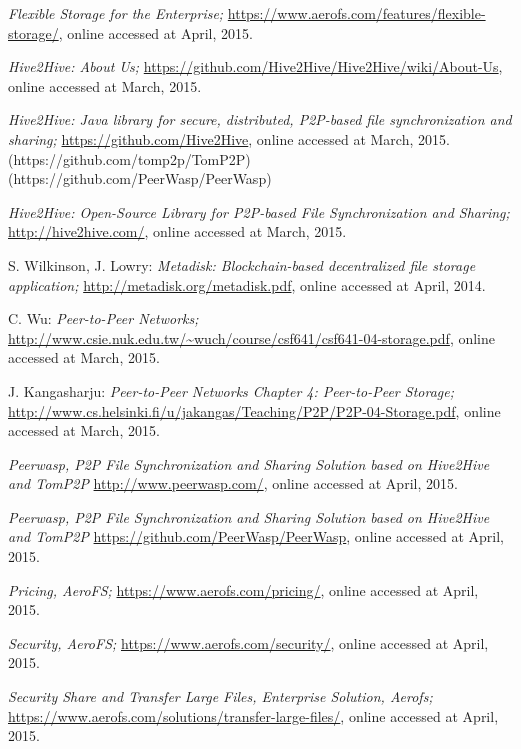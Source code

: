 \begin{thebibliography}{99}
		\emph{Flexible Storage for the Enterprise;}
		\url{https://www.aerofs.com/features/flexible-storage/},
		online accessed at April, 2015.

		\emph{Hive2Hive: About Us;}
		\url{https://github.com/Hive2Hive/Hive2Hive/wiki/About-Us},
		online accessed at March, 2015.

		\emph{Hive2Hive: Java library for secure, distributed, P2P-based file synchronization and sharing;}
		\url{https://github.com/Hive2Hive},
		online accessed at March, 2015.
	(https://github.com/tomp2p/TomP2P) (https://github.com/PeerWasp/PeerWasp)

		\emph{Hive2Hive: Open-Source Library for P2P-based File Synchronization and Sharing;}
		\url{http://hive2hive.com/},
		online accessed at March, 2015.

		S. Wilkinson, J. Lowry:
		\emph{Metadisk: Blockchain-based decentralized file storage application;}
		\url{http://metadisk.org/metadisk.pdf},
		online accessed at April, 2014.
		
		C. Wu:
		\emph{Peer-to-Peer Networks;}
		\url{http://www.csie.nuk.edu.tw/~wuch/course/csf641/csf641-04-storage.pdf},
		online accessed at March, 2015.

		J. Kangasharju:
		\emph{Peer-to-Peer Networks Chapter 4: Peer-to-Peer Storage;}
		\url{http://www.cs.helsinki.fi/u/jakangas/Teaching/P2P/P2P-04-Storage.pdf},
		online accessed at March, 2015.

		\emph{Peerwasp, P2P File Synchronization and Sharing Solution based on Hive2Hive and TomP2P}
		\url{http://www.peerwasp.com/},
		online accessed at April, 2015.

		\emph{Peerwasp, P2P File Synchronization and Sharing Solution based on Hive2Hive and TomP2P}
		\url{https://github.com/PeerWasp/PeerWasp},
		online accessed at April, 2015.

		\emph{Pricing, AeroFS;}
		\url{https://www.aerofs.com/pricing/},
		online accessed at April, 2015.

		\emph{Security, AeroFS;}
		\url{https://www.aerofs.com/security/},
		online accessed at April, 2015.
		
		\emph{Security Share and Transfer Large Files, Enterprise Solution, Aerofs;}
		\url{https://www.aerofs.com/solutions/transfer-large-files/},
		online accessed at April, 2015.
		

\end{thebibliography}
